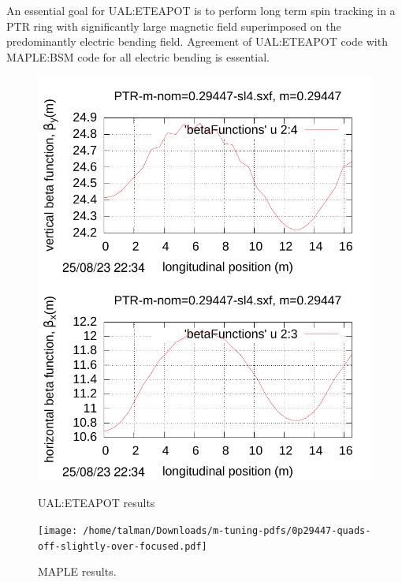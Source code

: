 \documentclass[]{article}
\begin{document}
An essential goal for UAL:ETEAPOT is to perform long term spin tracking in a PTR ring
with significantly large magnetic field superimposed on the predominantly electric bending
field.  Agreement of UAL:ETEAPOT code with MAPLE:BSM code for all electric bending
is essential. 
%
\begin{figure}[htbp]
\hspace{-0.6cm}
\begin{minipage}[b]{0.49\linewidth}
\centering
\includegraphics[scale=0.5]{pdf/Fig_II-3.pdf}
\includegraphics[scale=0.5]{pdf/Fig_II-1.pdf}
\caption{UAL:ETEAPOT results\hfill}
\label{fig:UAL-PTR-m=0.29447}
\end{minipage}
\begin{minipage}[b]{0.49\linewidth}
\centering
\texttt{[image: /home/talman/Downloads/m-tuning-pdfs/0p29447-quads-off-slightly-over-focused.pdf]}
\caption{MAPLE results.\hfill}
\label{fig:MAPLE-PTR-m=0.29447}
\end{minipage}
\end{figure}
%
%
\end{document}

